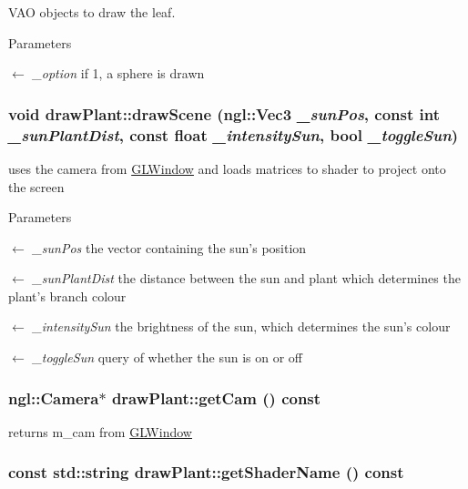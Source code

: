 VAO objects to draw the leaf. 
\begin{DoxyParams}{Parameters}
\item[\mbox{$\leftarrow$} {\em \_\-option}]if 1, a sphere is drawn \end{DoxyParams}
\hypertarget{classdrawPlant_a937ee4c2cd0961f36a21b9896dc01abf}{
\subsubsection[{drawScene}]{\setlength{\rightskip}{0pt plus 5cm}void drawPlant::drawScene (ngl::Vec3 {\em \_\-sunPos}, \/  const int {\em \_\-sunPlantDist}, \/  const float {\em \_\-intensitySun}, \/  bool {\em \_\-toggleSun})}}
\label{classdrawPlant_a937ee4c2cd0961f36a21b9896dc01abf}


uses the camera from \hyperlink{classGLWindow}{GLWindow} and loads matrices to shader to project onto the screen 
\begin{DoxyParams}{Parameters}
\item[\mbox{$\leftarrow$} {\em \_\-sunPos}]the vector containing the sun's position \item[\mbox{$\leftarrow$} {\em \_\-sunPlantDist}]the distance between the sun and plant which determines the plant's branch colour \item[\mbox{$\leftarrow$} {\em \_\-intensitySun}]the brightness of the sun, which determines the sun's colour \item[\mbox{$\leftarrow$} {\em \_\-toggleSun}]query of whether the sun is on or off \end{DoxyParams}
\hypertarget{classdrawPlant_aa01cdf1dd30ce5485445976aecb30797}{
\subsubsection[{getCam}]{\setlength{\rightskip}{0pt plus 5cm}ngl::Camera$\ast$ drawPlant::getCam () const}}
\label{classdrawPlant_aa01cdf1dd30ce5485445976aecb30797}


returns m\_\-cam from \hyperlink{classGLWindow}{GLWindow} \hypertarget{classdrawPlant_a510090864706457b3914fae0694608e7}{
\subsubsection[{getShaderName}]{\setlength{\rightskip}{0pt plus 5cm}const std::string drawPlant::getShaderName () const}}
\label{classdrawPlant_a510090864706457b3914fae0694608e7}


